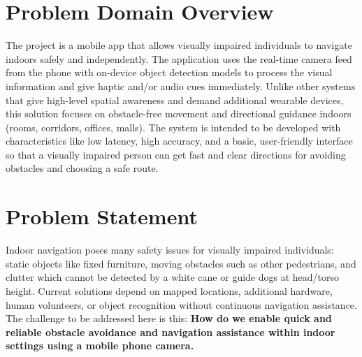 \documentclass{FastFyp}
\begin{document}
\section{Problem Domain Overview}
The project is a mobile app that allows visually impaired individuals to navigate indoors safely and independently. The application uses the real-time camera feed from the phone with on-device object detection models to process the visual information and give haptic and/or audio cues immediately. Unlike other systems that give high-level spatial awareness and demand additional wearable devices, this solution focuses on obstacle-free movement and directional guidance indoors (rooms, corridors, offices, malls). The system is intended to be developed with characteristics like low latency, high accuracy, and a basic, user-friendly interface so that a visually impaired person can get fast and clear directions for avoiding obstacles and choosing a safe route.

\section{Problem Statement}
Indoor navigation poses many safety issues for visually impaired individuals: static objects like fixed furniture, moving obstacles such as other pedestrians, and clutter which cannot be detected by a white cane or guide dogs at head/torso height. Current solutions depend on mapped locations, additional hardware, human volunteers, or object recognition without continuous navigation assistance. The challenge to be addressed here is this: \textbf{How do we enable quick and reliable obstacle avoidance and navigation assistance within indoor settings using a mobile phone camera.}
\end{document}

